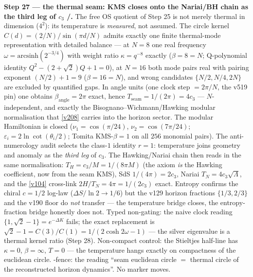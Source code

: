 \documentclass[11pt,a4paper]{article}
\theoremstyle{definition}
\begin{document}
\par\smallskip\noindent\textbf{Step 27 --- the thermal seam: KMS closes onto the Nariai/BH
chain as the third leg of $c_3$ \mE/\mC.} The free OS quotient of Step 25 is not merely
thermal in dimension ($4^2$): its temperature is \emph{measured}, not assumed. The circle
kernel $C(d)=(2/N)/\sin(\pi d/N)$ admits exactly one finite thermal-mode representation with
detailed balance --- at $N=8$ one real frequency $\omega=\mathrm{arcsinh}(2^{-3/4})$ with
weight ratio $\kappa=q^{-8}$ exactly ($\beta=8=N$; Q-polynomial identity
$Q^2-(2+\sqrt2)Q+1=0$), at $N=16$ both mode pairs real with pairing exponent
$(N/2)+1=9$ ($\beta=16=N$), and wrong candidates $\{N/2,N/4,2N\}$ are excluded by
quantified gaps. In angle units (one clock step $=2\pi/N$, the v519 pin) one obtains
$\beta_{\mathrm{angle}}=2\pi$ exact, hence $T_{\mathrm{seam}}=1/(2\pi)=4c_3$ ---
$N$-independent, and exactly the Bisognano--Wichmann/Hawking modular normalisation that
\vref{v208} carries into the horizon sector. The modular Hamiltonian is closed
($\nu_1=\cos(\pi/24)$, $\nu_2=\cos(7\pi/24)$; $\varepsilon_i=2\ln\cot(\theta_i/2)$;
Tomita KMS-$\beta=1$ on all $256$ monomial pairs). The anti-numerology audit selects the
class-$1$ identity $r=1$: temperature joins geometry and anomaly as the \emph{third leg}
of $c_3$. The Hawking/Nariai chain then reads in the same normalisation:
$T_H=c_3/M=1/(8\pi M)$ (the axiom \emph{is} the Hawking coefficient, now from the seam
KMS), SdS $1/(4\pi)=2c_3$, Nariai $T_N=4c_3\sqrt{\Lambda}$, and the \vref{v104}
cross-link $2H/T_N=4\pi=1/(2c_3)$ exact. Entropy confirms the chiral $c=1/2$ log-law
($\Delta S/\ln2\to1/6$) but the v129 horizon fractions $\{1/3,2/3\}$ and the v190 floor
do \emph{not} transfer --- the temperature bridge closes, the entropy-fraction bridge
honestly does not. Typed non-gating: the naive clock reading
$\{1,\sqrt2-1\}=e^{-\Delta K}$ fails; the exact replacement is
$\sqrt2-1=C(3)/C(1)=1/(2\cosh 2\omega-1)$ --- the silver eigenvalue is a thermal kernel
ratio (Step 28). Non-compact control: the Stieltjes half-line has $\kappa=0$,
$\beta=\infty$, $T=0$ --- the temperature hangs exactly on compactness of the euclidean
circle. \mC-fence: the reading ``seam euclidean circle $=$ thermal circle of the
reconstructed horizon dynamics''. No marker moves.
\end{document}

